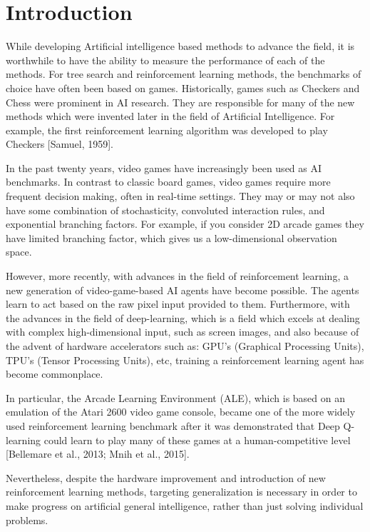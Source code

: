\documentclass[conference]{IEEEtran}
\begin{document}
\section{Introduction}
While developing Artificial intelligence based methods to advance the field, it is worthwhile to have the ability to measure the performance of each of the methods. For tree search and reinforcement learning methods, the benchmarks of choice have often been based on games. Historically, games such as Checkers and Chess were prominent in AI research. They are responsible for many of the new methods which were invented later in the field of Artificial Intelligence. For example, the first reinforcement learning algorithm was developed to play Checkers [Samuel, 1959].

In the past twenty years, video games have increasingly been used as AI benchmarks. In contrast to classic board games, video games require more frequent decision making, often in real-time settings. They may or may not also have some combination of stochasticity, convoluted interaction rules, and exponential branching factors. For example, if you consider 2D arcade games they have limited branching factor, which gives us a low-dimensional observation space. 

However, more recently, with advances in the field of reinforcement learning, a new generation of video-game-based AI agents have become possible. The agents learn to act based on the raw pixel input provided to them. Furthermore, with the advances in the field of deep-learning, which is a field which excels at dealing with complex high-dimensional input, such as screen images, and also because of the advent of hardware accelerators such as: GPU's (Graphical Processing Units), TPU's (Tensor Processing Units), etc, training a reinforcement learning agent has become commonplace.

In particular, the Arcade Learning Environment (ALE), which is based on an emulation of the Atari 2600 video game console, became one of the more widely used reinforcement learning benchmark after it was demonstrated that Deep Q-learning could learn to play many of these games at a human-competitive level [Bellemare et al., 2013; Mnih et al., 2015].

Nevertheless, despite the hardware improvement and introduction of new reinforcement learning methods, targeting generalization is
necessary in order to make progress on artificial general intelligence, rather than just solving individual problems.
\end{document}
